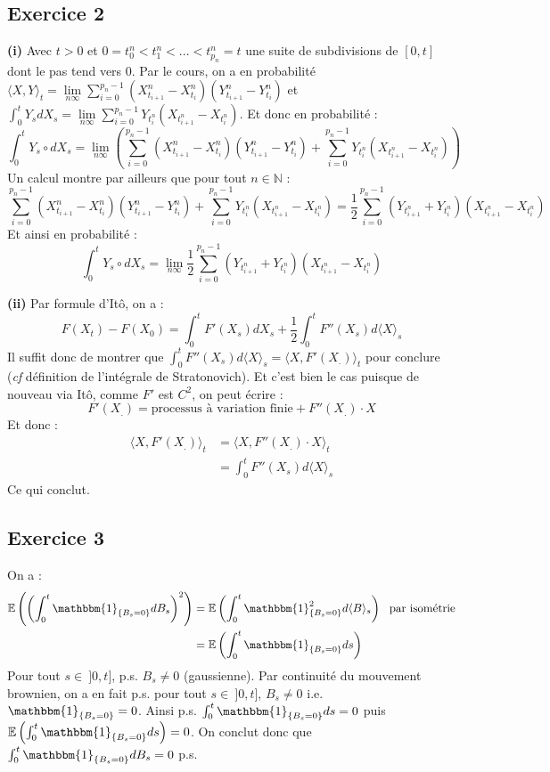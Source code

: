 \documentclass[a4paper,12pt]{article}
\newcommand{\E}{\mathbb{E}}
\newcommand{\ind}{\mathbbm{1}}
\newcommand{\n}{\mathbb{N}}
\begin{document}
\subsection{Exercice 2}
\textbf{(i)} Avec $t>0$ et $0=t_0^n < t_1^n <...<t_{p_n}^n =t$ une suite de subdivisions de $[0,t]$ dont le pas tend vers $0$. Par le cours, on a en probabilité $\langle X,Y \rangle_t = \lim\limits_{n \infty} \sum_{i=0}^{p_n-1} (X_{t_{i+1}}^n - X_{t_i}^n)(Y_{t_{i+1}}^n - Y_{t_i}^n)$ et $\int_0^t Y_s dX_s = \lim\limits_{n \infty} \sum_{i=0}^{p_n -1}Y_{t_i^n} (X_{t_{i+1}^n} - X_{t_i^n})$. Et donc en probabilité :
$$\int_0^t Y_s \circ dX_s = \lim\limits_{n \infty} \left( \sum_{i=0}^{p_n-1} (X_{t_{i+1}}^n - X_{t_i}^n)(Y_{t_{i+1}}^n - Y_{t_i}^n) + \sum_{i=0}^{p_n-1} Y_{t_i^n} (X_{t_{i+1}^n} - X_{t_i^n}) \right) $$
Un calcul montre par ailleurs que pour tout $n \in \n$ :
$$\sum_{i=0}^{p_n-1} (X_{t_{i+1}}^n - X_{t_i}^n)(Y_{t_{i+1}}^n - Y_{t_i}^n) + \sum_{i=0}^{p_n-1} Y_{t_i^n} (X_{t_{i+1}^n} - X_{t_i^n})  = \frac{1}{2} \sum_{i=0}^{p_n -1} (Y_{t_{i+1}^n} + Y_{t_{i}^n}) (X_{t_{i+1}^n} - X_{t_{i}^n})$$
Et ainsi en probabilité :
$$\int_0^t Y_s \circ dX_s = \lim\limits_{n \infty} \frac{1}{2} \sum_{i=0}^{p_n -1} (Y_{t_{i+1}^n} + Y_{t_{i}^n}) (X_{t_{i+1}^n} - X_{t_{i}^n})$$

\textbf{(ii)} Par formule d'Itô, on a :
$$F(X_t)-F(X_0)=\int_0^t F'(X_s) dX_s + \frac{1}{2} \int_0^t F''(X_s)d \langle X \rangle_s$$
Il suffit donc de montrer que $\int_0^t F''(X_s) d \langle X \rangle_s = \langle X, F'(X_.) \rangle_t$ pour conclure (\textit{cf} définition de l'intégrale de Stratonovich). Et c'est bien le cas puisque de nouveau via Itô, comme $F'$ est $C^2$, on peut écrire :
$$F'(X_.) = \text{processus à variation finie} + F'' (X_. ) \cdot X$$
Et donc :
\begin{align*}
\langle X, F'(X_. ) \rangle_t & = \langle X, F''(X_. ) \cdot X \rangle_t \\
& = \int_0^t F''(X_s) d \langle X \rangle_s
\end{align*}
Ce qui conclut.

\subsection{Exercice 3}
On a :
\begin{align*}
\E \left( \left( \int_0^t \ind_{\{B_s = 0\}} dB_s \right)^2 \right) & = \E \left( \int_0^t \ind_{\{B_s = 0\}}^2 d \langle B \rangle_s \right) \ \ \text{par isométrie} \\
& = \E \left(\int_0^t \ind_{\{B_s = 0\}}  ds \right)
\end{align*}
Pour tout $s \in \ ]0,t]$, p.s. $B_s \neq 0$ (gaussienne). Par continuité du mouvement brownien, on a en fait p.s. pour tout $s \in \ ]0,t]$, $B_s \neq 0$ i.e. $\ind_{\{ B_s = 0 \}} = 0$. Ainsi p.s. $\int_0^t \ind_{\{ B_s = 0 \}} ds = 0$ puis $\E \left( \int_0^t \ind_{\{ B_s = 0 \}} ds \right) = 0 $. On conclut donc que $\int_0^t \ind_{\{B_s = 0\}} dB_s = 0$ p.s.
\end{document}
